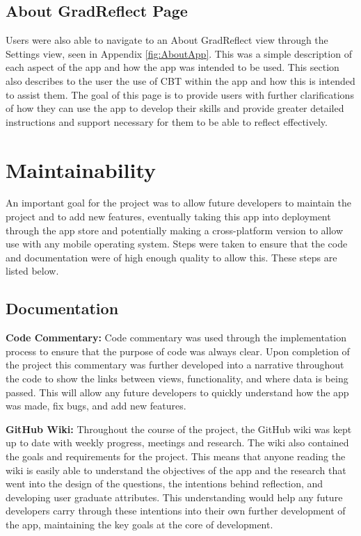 \documentclass{l4proj}
\begin{document}
\subsection{About GradReflect Page}

Users were also able to navigate to an About GradReflect view through the Settings view, seen in Appendix \ref{fig:AboutApp}. This was a simple description of each aspect of the app and how the app was intended to be used. This section also describes to the user the use of CBT within the app and how this is intended to assist them. The goal of this page is to provide users with further clarifications of how they can use the app to develop their skills and provide greater detailed instructions and support necessary for them to be able to reflect effectively. 


\section{Maintainability}
An important goal for the project was to allow future developers to maintain the project and to add new features, eventually taking this app into deployment through the app store and potentially making a cross-platform version to allow use with any mobile operating system. Steps were taken to ensure that the code and documentation were of high enough quality to allow this. These steps are listed below.

\subsection{Documentation}

\textbf{Code Commentary:} Code commentary was used through the implementation process to ensure that the purpose of code was always clear. Upon completion of the project this commentary was further developed into a narrative throughout the code to show the links between views, functionality, and where data is being passed. This will allow any future developers to quickly understand how the app was made, fix bugs, and add new features.

\textbf{GitHub Wiki:} Throughout the course of the project, the GitHub wiki was kept up to date with weekly progress, meetings and research. The wiki also contained the goals and requirements for the project. This means that anyone reading the wiki is easily able to understand the objectives of the app and the research that went into the design of the questions, the intentions behind reflection, and developing user graduate attributes. This understanding would help any future developers carry through these intentions into their own further development of the app, maintaining the key goals at the core of development. 
\end{document}
